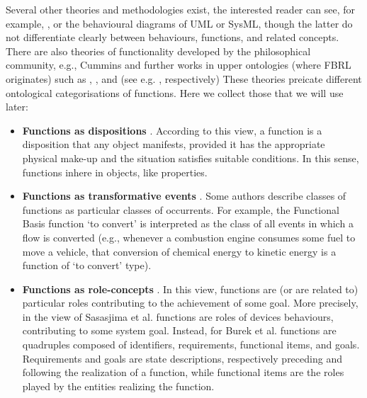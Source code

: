 \documentclass[
]{ceurart}
\begin{document}
Several other theories and methodologies exist, the interested reader can see, for example, \cite{umedaFunctionBehaviourStructure1990,qianFunctionBehaviorStructure1996}, or the behavioural diagrams of UML or SysML, %
though the latter do not differentiate clearly between behaviours, functions, and related concepts. %
There are also theories of functionality developed by the philosophical community, e.g., Cummins \cite{cumminsFunctionalAnalysis1975} and further works in upper ontologies (where FBRL originates) such as \BFO, \GFO, \YAMATO and \DOLCE (see e.g. \cite{spearFunctionsBasicFormal2016, herreGeneralFormalOntology2006, sasajimaFBRLFunctionBehavior1995, borgoFormalOntologicalPerspective2009}, respectively)
These theories preicate different ontological categorisations of functions. 
Here we collect those that we will use later:
\begin{itemize}
  \item \textbf{Functions as dispositions} \cite{arpFunctionRoleDisposition2008, barryBasicFormalOntology2015}. According to this view, a function is a disposition that any object manifests, provided it has the appropriate physical make-up and the situation satisfies suitable conditions. In this sense, functions inhere in objects, like properties. 
  \item \textbf{Functions as transformative events} \cite{borgoFormalizationFunctionsOperations2011, garbaczTwoOntologydrivenFormalisations2011, garbaczStandardTaxonomyArtifact2005}.
  Some authors describe classes of functions as particular classes of occurrents. For example, the Functional Basis function `to convert' is interpreted as the class of all events in which a flow is converted (e.g., whenever a combustion engine consumes some fuel to move a vehicle, that conversion of chemical energy to kinetic energy is a function of `to convert' type).%
  \item \textbf{Functions as role-concepts} \cite{sasajimaFBRLFunctionBehavior1995,burekToplevelOntologyFunctions2006}. In this view, functions are (or are related to) particular roles contributing to the achievement of some goal. More precisely, in the view of Sasasjima et al. \cite{sasajimaFBRLFunctionBehavior1995} functions are roles of devices behaviours, contributing to some system goal. Instead, for Burek et al. \cite{burekToplevelOntologyFunctions2006} functions are quadruples composed of identifiers, requirements, functional items, and goals. Requirements and goals are state descriptions, respectively preceding and following the realization of a function, while functional items are the roles played by the entities realizing the function. 
\end{itemize}
\end{document}
